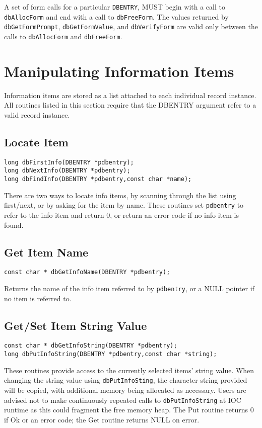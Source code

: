 A set of form calls for a particular \verb|DBENTRY|, MUST begin with a call to \verb|dbAllocForm| and end with a call to 
\verb|dbFreeForm|. The values returned by \verb|dbGetFormPrompt|, \verb|dbGetFormValue|, and \verb|dbVerifyForm| are valid only 
between the calls to \verb|dbAllocForm| and \verb|dbFreeForm|.

\section{Manipulating Information Items}

Information items are stored as a list attached to each individual record instance. All routines listed in this section require 
that the DBENTRY argument refer to a valid record instance.

\subsection{Locate Item}

\begin{verbatim}long dbFirstInfo(DBENTRY *pdbentry);
long dbNextInfo(DBENTRY *pdbentry);
long dbFindInfo(DBENTRY *pdbentry,const char *name);
\end{verbatim}
There are two ways to locate info items, by scanning through the list using first/next, or by asking for the item by name. 
These routines set \verb|pdbentry| to refer to the info item and return 0, or return an error code if no info item is found.

\subsection{Get Item Name}

\begin{verbatim}const char * dbGetInfoName(DBENTRY *pdbentry);
\end{verbatim}Returns the name of the info item referred to by \verb|pdbentry|, or a NULL pointer if no item is referred to.

\subsection{Get/Set Item String Value}

\begin{verbatim}const char * dbGetInfoString(DBENTRY *pdbentry);
long dbPutInfoString(DBENTRY *pdbentry,const char *string);
\end{verbatim}
These routines provide access to the currently selected items' string value. When changing the string value using 
\verb|dbPutInfoSting|, the character string provided will be copied, with additional memory being allocated as necessary. 
Users are advised not to make continuously repeated calls to \verb|dbPutInfoString| at IOC runtime as this could fragment 
the free memory heap. The Put routine returns 0 if Ok or an error code; the Get routine returns NULL on error.

